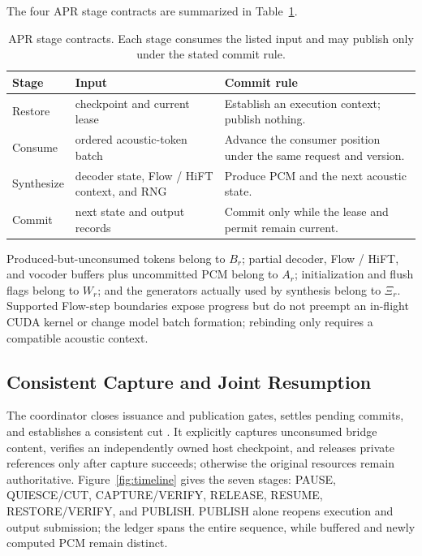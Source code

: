 \documentclass{article}
\begin{document}
The four APR stage contracts are summarized in Table~\ref{tab:apr_progression}.
\begin{table}[t]
\centering
\small
\caption{APR stage contracts. Each stage consumes the listed input and may publish only under the stated commit rule.}\label{tab:apr_progression}
\begin{tabular}{@{}p{.17\linewidth}p{.29\linewidth}p{.40\linewidth}@{}}
\toprule
Stage & Input & Commit rule \\
\midrule
Restore & checkpoint and current lease & Establish an execution context; publish nothing. \\
Consume & ordered acoustic-token batch & Advance the consumer position under the same request and version. \\
Synthesize & decoder state, Flow / HiFT context, and RNG & Produce PCM and the next acoustic state. \\
Commit & next state and output records & Commit only while the lease and permit remain current. \\
\bottomrule\end{tabular}
\end{table}

Produced-but-unconsumed tokens belong to $B_r$; partial decoder, Flow / HiFT,
and vocoder buffers plus uncommitted PCM belong to $A_r$; initialization and
flush flags belong to $W_r$; and the generators actually used by synthesis
belong to $\Xi_r$. Supported Flow-step boundaries expose progress but do not
preempt an in-flight CUDA kernel or change model batch formation; rebinding
only requires a compatible acoustic context.

\subsection{Consistent Capture and Joint Resumption}
\label{sec:design_protocol}

The coordinator closes issuance and publication gates, settles pending
commits, and establishes a consistent cut \citep{chandy1985}. It explicitly
captures unconsumed bridge content, verifies an independently owned host
checkpoint, and releases private references only after capture succeeds;
otherwise the original resources remain authoritative.
Figure~\ref{fig:timeline} gives the seven stages: PAUSE, QUIESCE/CUT,
CAPTURE/VERIFY, RELEASE, RESUME, RESTORE/VERIFY, and PUBLISH. PUBLISH alone
reopens execution and output submission; the ledger spans the entire
sequence, while buffered and newly computed PCM remain distinct.
\end{document}
